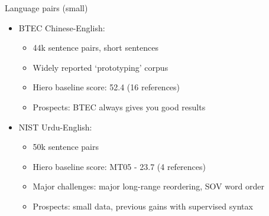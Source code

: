 \documentclass{beamer}
\newenvironment{unpacked_itemize}{
\begin{itemize}
  \setlength{\itemsep}{10pt}
  \setlength{\parskip}{0pt}
  \setlength{\parsep}{0pt}
}{\end{itemize}}
\begin{document}


\begin{frame}[t]{Language pairs (small)}
\begin{itemize}
\item BTEC Chinese-English:
  \begin{itemize}
  \item 44k sentence pairs, short sentences
  \item Widely reported `prototyping' corpus
  \item Hiero baseline score: 52.4 (16 references)
  \item Prospects: BTEC always gives you good results
  \end{itemize}
\item NIST Urdu-English:
  \begin{itemize}
  \item 50k sentence pairs
  \item Hiero baseline score: MT05 - 23.7 (4 references)
  \item Major challenges: major long-range reordering, SOV word order
  \item Prospects: small data, previous gains with supervised syntax
  \end{itemize}
\end{itemize}
\end{frame}
\end{document}
